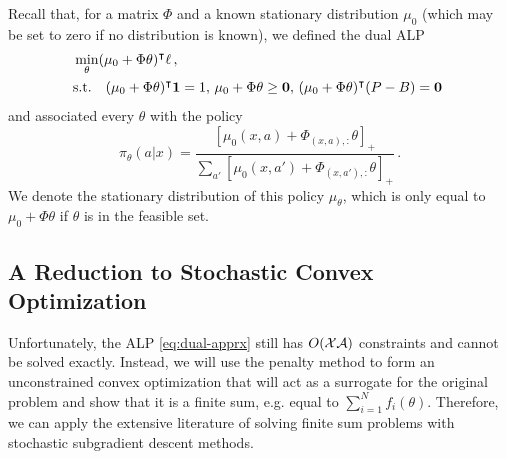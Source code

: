 \documentclass[11pt]{article}
\begin{document}
Recall that, for a matrix $\Phi$ and a known stationary distribution $\mu_0$ (which may be set to zero if no distribution is known), we defined the dual ALP
\begin{align*}
&\min_{\theta} (\mu_0+  \Phi \theta)^\top \ell\,, \\
\notag
&\mbox{s.t.}\quad (\mu_0+  \Phi \theta)^\top \mathbf 1 = 1,\, \mu_0 + \Phi \theta \geq \mathbf 0,\, (\mu_0+  \Phi \theta)^\top (P - B) = \mathbf 0 \;
\end{align*}
and associated every $\theta$ with the policy
\begin{equation*}
\pi_{\theta}(a|x) = \frac{[\mu_0(x,a) + \Phi_{(x,a),:} \theta]_{+}}{\sum_{a'} [\mu_0(x,a') + \Phi_{(x,a'),:} \theta]_{+}} \,.
\end{equation*}
We denote the stationary distribution of this policy $\mu_{\theta}$, which is only equal to $\mu_0+\Phi\theta$ if $\theta$ is in the feasible set.

\subsection{A Reduction to Stochastic Convex Optimization}
Unfortunately, the ALP \eqref{eq:dual-apprx} still has $O(\cX\cA)$ constraints and cannot be solved exactly. Instead, we will use the penalty method to form an unconstrained convex optimization that will act as a surrogate for the original problem and show that it is a finite sum, e.g. equal to $\sum_{i=1}^N f_i(\theta)$. Therefore, we can apply the extensive literature of solving finite sum problems with stochastic subgradient descent methods.
\end{document}
